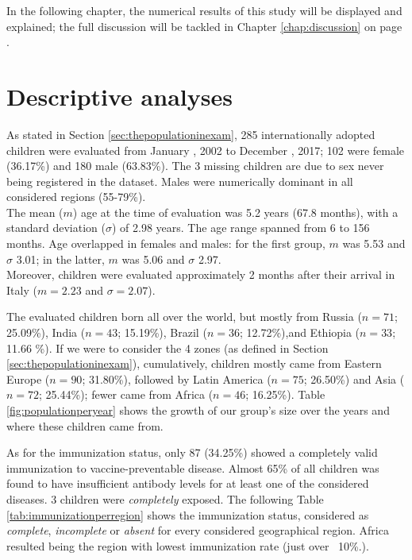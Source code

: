 

\label{chap:results}
In the following chapter, the numerical results of this study will be displayed and explained; the full discussion will be tackled in Chapter \ref{chap:discussion} on page \pageref{chap:discussion}.

\section{Descriptive analyses}\label{sec:descriptiveanalyses}
As stated in Section \ref{sec:thepopulationinexam}, 285 internationally adopted children were evaluated from January , 2002 to December , 2017; 102 were female (36.17\%) and 180 male (63.83\%). The 3 missing children are due to sex never being registered in the dataset. Males were numerically dominant in all considered regions (55-79\%).\\
The mean ($m$) age at the time of evaluation was 5.2 years (67.8 months), with a standard deviation ($\sigma$) of 2.98 years. The age range spanned from 6 to 156 months. Age overlapped in females and males: for the first group, $m$ was 5.53 and $\sigma$ 3.01; in the latter, $m$ was 5.06 and $\sigma$ 2.97.\\
Moreover, children were evaluated approximately 2 months after their arrival in Italy ($m = 2.23$ and $\sigma = 2.07$).

The evaluated children born all over the world, but mostly from Russia ($n = 71$; 25.09\%), India ($n = 43$; 15.19\%), Brazil ($n = 36$; 12.72\%),and Ethiopia ($n = 33$; 11.66 \%). If we were to consider the 4 zones (as defined in Section \ref{sec:thepopulationinexam}), cumulatively, children mostly came from Eastern Europe ($n = 90$; 31.80\%), followed by Latin America ($n = 75$; 26.50\%) and Asia ($n = 72$; 25.44\%); fewer came from Africa ($n = 46$; 16.25\%). Table \ref{fig:populationperyear} shows the growth of our group's size over the years and where these children came from.

As for the immunization status, only 87 (34.25\%) showed a completely valid immunization to vaccine-preventable disease. Almost 65\% of all children was found to have insufficient antibody levels for at least one of the considered diseases. 3 children were \textit{completely} exposed. The following Table \ref{tab:immunizationperregion} shows the immunization status, considered as \textit{complete}, \textit{incomplete} or \textit{absent} for every considered geographical region. Africa resulted being the region with lowest immunization rate (just over ~10\%.).

